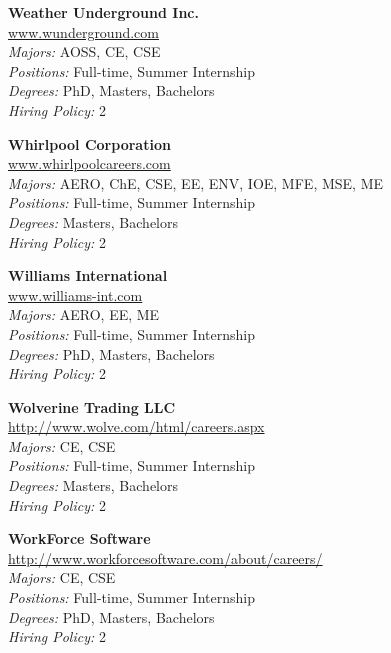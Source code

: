 \documentclass[twoside]{article}
\begin{document}
\begin{center}
\begin{multicols}{3}
\begin{minipage}{.9\columnwidth}{\Large\bf Weather Underground Inc. }\\
	\url{www.wunderground.com}\\
	\emph{Majors:} AOSS, CE, CSE\\
	\emph{Positions:} Full-time, Summer Internship\\
	\emph{Degrees:} PhD, Masters, Bachelors\\
	\emph{Hiring Policy:} 2\\
\end{minipage}
 
\begin{minipage}{.9\columnwidth}{\Large\bf Whirlpool Corporation }\\
	\url{www.whirlpoolcareers.com}\\
	\emph{Majors:} AERO, ChE, CSE, EE, ENV, IOE, MFE, MSE, ME\\
	\emph{Positions:} Full-time, Summer Internship\\
	\emph{Degrees:} Masters, Bachelors\\
	\emph{Hiring Policy:} 2\\
\end{minipage}
 
\begin{minipage}{.9\columnwidth}{\Large\bf Williams International }\\
	\url{www.williams-int.com}\\
	\emph{Majors:} AERO, EE, ME\\
	\emph{Positions:} Full-time, Summer Internship\\
	\emph{Degrees:} PhD, Masters, Bachelors\\
	\emph{Hiring Policy:} 2\\
\end{minipage}
 
\begin{minipage}{.9\columnwidth}{\Large\bf Wolverine Trading LLC }\\
	\url{http://www.wolve.com/html/careers.aspx}\\
	\emph{Majors:} CE, CSE\\
	\emph{Positions:} Full-time, Summer Internship\\
	\emph{Degrees:} Masters, Bachelors\\
	\emph{Hiring Policy:} 2\\
\end{minipage}
 
\begin{minipage}{.9\columnwidth}{\Large\bf WorkForce Software }\\
	\url{http://www.workforcesoftware.com/about/careers/}\\
	\emph{Majors:} CE, CSE\\
	\emph{Positions:} Full-time, Summer Internship\\
	\emph{Degrees:} PhD, Masters, Bachelors\\
	\emph{Hiring Policy:} 2\\
\end{minipage}
 

\end{multicols}
\end{center}
\end{document}
